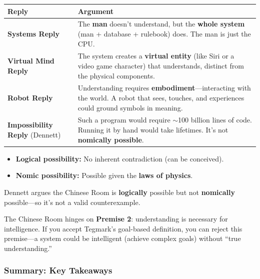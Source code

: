\begin{center}
\renewcommand{\arraystretch}{1.4}
\begin{tabular}{@{} l p{9cm} @{}}
\toprule
\textbf{Reply} & \textbf{Argument} \\
\midrule
\textbf{Systems Reply} & The \textbf{man} doesn't understand, but the \textbf{whole system} (man + database + rulebook) does. The man is just the CPU. \\
\textbf{Virtual Mind Reply} & The system creates a \textbf{virtual entity} (like Siri or a video game character) that understands, distinct from the physical components. \\
\textbf{Robot Reply} & Understanding requires \textbf{embodiment}---interacting with the world. A robot that sees, touches, and experiences could ground symbols in meaning. \\
\textbf{Impossibility Reply} (Dennett) & Such a program would require $\sim$100 billion lines of code. Running it by hand would take lifetimes. It's not \textbf{nomically possible}. \\
\bottomrule
\end{tabular}
\end{center}

\begin{defbox}
\begin{itemize}
  \item \textbf{Logical possibility:} No inherent contradiction (can be conceived).
  \item \textbf{Nomic possibility:} Possible given the \textbf{laws of physics}.
\end{itemize}

Dennett argues the Chinese Room is \textbf{logically} possible but not \textbf{nomically} possible---so it's not a valid counterexample.
\end{defbox}

\begin{tipbox}
The Chinese Room hinges on \textbf{Premise 2}: understanding is necessary for intelligence. If you accept Tegmark's goal-based definition, you can reject this premise---a system could be intelligent (achieve complex goals) without ``true understanding.''
\end{tipbox}

\bigseparator

\subsubsection{Summary: Key Takeaways}


